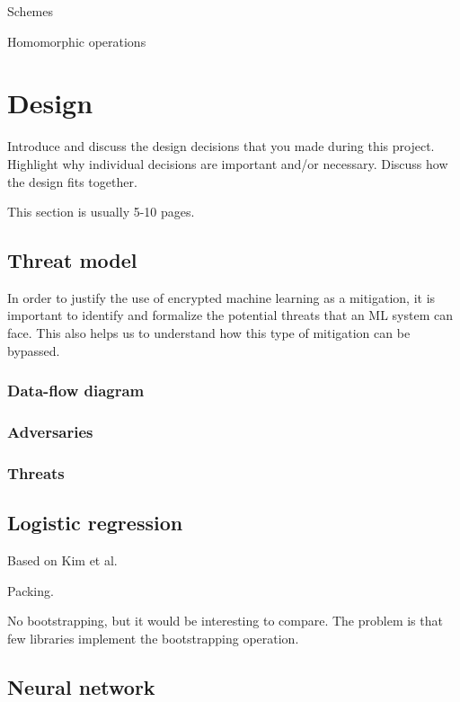 \documentclass[a4paper,11pt,oneside]{report}
\begin{document}
Schemes

Homomorphic operations


\chapter{Design}

Introduce and discuss the design decisions that you made during this project.
Highlight why individual decisions are important and/or necessary. Discuss
how the design fits together.

This section is usually 5-10 pages.

\section{Threat model}

In order to justify the use of encrypted machine learning as a mitigation, it is important to identify and formalize the potential threats that an ML system can face. This also helps us to understand how this type of mitigation can be bypassed.

\subsection{Data-flow diagram}

\subsection{Adversaries}

\subsection{Threats}

\section{Logistic regression}

Based on Kim et al. ~\cite{kim_logistic_2018}

Packing.

No bootstrapping, but it would be interesting to compare. The problem is that few libraries implement the bootstrapping operation.

\section{Neural network}
\end{document}
